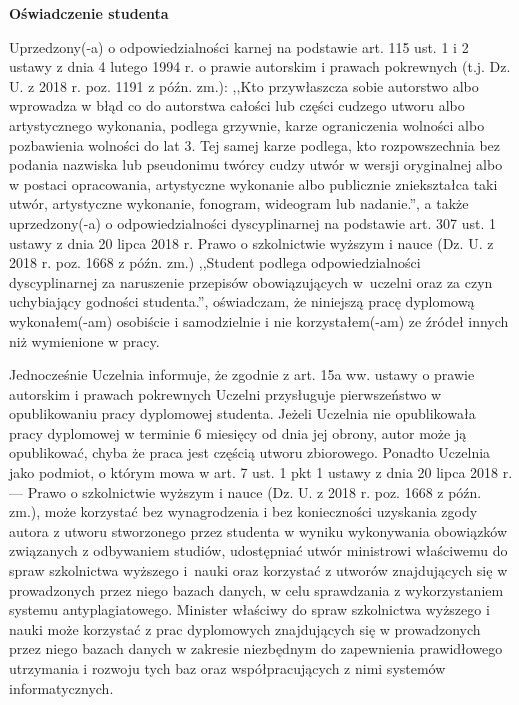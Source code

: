 \documentclass[a4paper,12pt]{article}
\begin{document}
\begin{center}
        {\bf\large\textsf{Oświadczenie studenta}}
\end{center}


{\sf Uprzedzony(-a) o odpowiedzialności karnej na podstawie art. 115 ust. 1 i 2 ustawy z dnia 4 lutego 1994 r. o prawie autorskim i prawach pokrewnych (t.j. Dz. U. z 2018 r. poz. 1191 z późn. zm.): ,,Kto przywłaszcza sobie autorstwo albo wprowadza w błąd co do autorstwa całości lub części cudzego utworu albo artystycznego wykonania, podlega grzywnie, karze ograniczenia wolności albo pozbawienia wolności do lat 3. Tej samej karze podlega, kto rozpowszechnia bez podania nazwiska lub pseudonimu twórcy cudzy utwór w wersji oryginalnej albo w postaci opracowania, artystyczne wykonanie albo publicznie zniekształca taki utwór, artystyczne wykonanie, fonogram, wideogram lub nadanie.'', a także uprzedzony(-a) o odpowiedzialności dyscyplinarnej na podstawie art. 307 ust. 1 ustawy z dnia 20 lipca 2018 r. Prawo o szkolnictwie wyższym i nauce (Dz. U. z 2018 r. poz. 1668 z późn. zm.) ,,Student podlega odpowiedzialności dyscyplinarnej za naruszenie przepisów obowiązujących w~uczelni oraz za czyn uchybiający godności studenta.'', oświadczam, że niniejszą pracę dyplomową wykonałem(-am) osobiście i samodzielnie i nie korzystałem(-am) ze źródeł innych niż wymienione w pracy.

\bigskip

Jednocześnie Uczelnia informuje, że zgodnie z art. 15a ww. ustawy o prawie autorskim i prawach pokrewnych Uczelni przysługuje pierwszeństwo w opublikowaniu pracy dyplomowej studenta. Jeżeli Uczelnia nie opublikowała pracy dyplomowej w terminie 6 miesięcy od dnia jej obrony, autor może ją opublikować, chyba że praca jest częścią utworu zbiorowego. Ponadto Uczelnia jako podmiot, o którym mowa w art. 7 ust. 1 pkt 1 ustawy z dnia 20 lipca 2018 r. --- Prawo o szkolnictwie wyższym i nauce (Dz. U. z 2018 r. poz. 1668 z późn. zm.), może korzystać bez wynagrodzenia i bez konieczności uzyskania zgody autora z utworu stworzonego przez studenta w wyniku wykonywania obowiązków związanych z odbywaniem studiów, udostępniać utwór ministrowi właściwemu do spraw szkolnictwa wyższego i~nauki oraz korzystać z utworów znajdujących się w prowadzonych przez niego bazach danych, w celu sprawdzania z wykorzystaniem systemu antyplagiatowego. Minister właściwy do spraw szkolnictwa wyższego i nauki może korzystać z prac dyplomowych znajdujących się w prowadzonych przez niego bazach danych w zakresie niezbędnym do zapewnienia prawidłowego utrzymania i rozwoju tych baz oraz współpracujących z nimi systemów informatycznych.}
\end{document}
